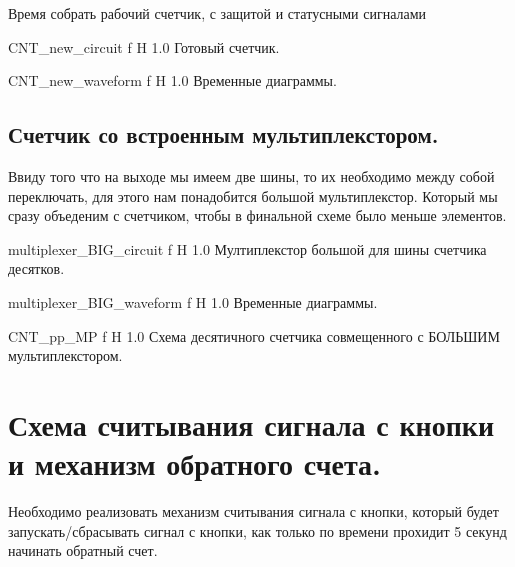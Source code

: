 \documentclass{bmstu}
\begin{document}
	\begin{flushleft}	
		Время собрать рабочий счетчик, с защитой и статусными сигналами
	\end{flushleft}
	
	{CNT_new_circuit}
	{f} %
	{H} %
	{1.0\textwidth} %
	{Готовый счетчик.} %
	
	{CNT_new_waveform}
	{f} %
	{H} %
	{1.0\textwidth} %
	{Временные диаграммы.} %

	\section{Счетчик со встроенным мультиплекстором.}

	\begin{flushleft}
		Ввиду того что на выходе мы имеем две шины, то их необходимо между
		собой переключать, для этого нам понадобится большой мультиплекстор.
		Который мы сразу объеденим с счетчиком, чтобы в финальной
		схеме было меньше элементов.
	\end{flushleft}

	{multiplexer_BIG_circuit}
	{f} %
	{H} %
	{1.0\textwidth} %
	{Мултиплекстор большой для шины счетчика десятков.} %
	
	{multiplexer_BIG_waveform}
	{f} %
	{H} %
	{1.0\textwidth} %
	{Временные диаграммы.} %
	
	{CNT_pp_MP}
	{f} %
	{H} %
	{1.0\textwidth} %
	{Схема десятичного счетчика совмещенного с БОЛЬШИМ мультиплекстором.} %


	\chapter{Схема считывания сигнала с кнопки и механизм обратного счета.}
	
	\begin{flushleft}
		Необходимо реализовать механизм считывания сигнала с кнопки, 
		который будет запускать/сбрасывать сигнал с кнопки, 
		как только по времени прохидит 5 секунд начинать обратный счет.
	\end{flushleft}
\end{document}
